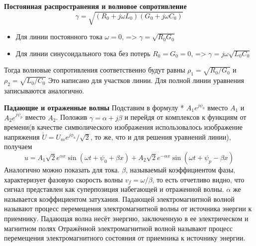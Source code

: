 {\bfseries Постоянная распространения и волновое сопротивление } 
$$
\gamma = \sqrt{(R_0 + j\omega L_0)(G_0 + j\omega C_0)}
$$
\begin{itemize}
\item Для линии постоянного тока $\omega = 0$, => $\gamma = \sqrt{R_0 G_0} $
\item Для линии синусоидального тока без потерь $R_0 = G_0 = 0$, => $\gamma = j\omega\sqrt{L_0 C_0}$
\end{itemize}
Тогда волновые сопротивления соответственно будут равны
$\rho_1 = \sqrt{R_0 / G_0} $ и $\rho_2 = \sqrt{L_0 /C_0}$
Это написано для участков линии. Для полной линии уравнения записываются аналогично. 

{\bfseries Падающие и отраженные волны}
Подставим в формулу * $A_1 e^{j\psi_0}$ вместо $A_1$ и $A_2 e^{j\psi_p}$ вместо $A_2$. Положив $\gamma = \alpha + j\beta$ и перейдя от комплексов к функциям от времени(в качестве символического изображения использовалось изображение напряжения $\dot{U} = U_m e^{j\phi_u}/\sqrt{2}$, то же, что и для решения уравнений линии), получаем
$$
u = A_1 \sqrt{2}e^{\alpha x}\sin(\omega t + \psi_0 + \beta x) + A_2\sqrt{2}e^{-\alpha x}\sin(\omega t + \psi_p - \beta x)
$$
Аналогично можно показать для тока.
$\beta$, называемый коэффициентом фазы, характеризует фазовую скорость волны $v_f = \omega/\beta$, то есть отчетливо видно, что сигнал представлен как суперпозиция набегающей и отраженной волны. $\alpha$ же называется коэффициентом затухания.
Падающей электромагнитной волной называют процесс перемещения электромагнитной волны от источника энергии к приемнику. Падающая волна несёт энергию, заключенную в ее электрическом и магнитном полях
Отражённой электромагнитной волной называют процесс перемещения электромагнитного состояния от приемника к источнику энергии.

